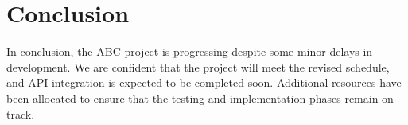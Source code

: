 \documentclass[12pt]{article}
\begin{document}
\section{Conclusion}
In conclusion, the ABC project is progressing despite some minor delays in development. We are confident that the project will meet the revised schedule, and API integration is expected to be completed soon. Additional resources have been allocated to ensure that the testing and implementation phases remain on track.
\end{document}
